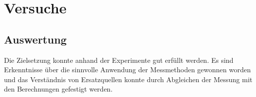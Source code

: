 \part{Versuche}











\chapter{Auswertung}

Die Zielsetzung konnte anhand der Experimente gut erfüllt werden.
Es sind Erkenntnisse über die sinnvolle Anwendung der Messmethoden gewonnen worden und das Verständnis von Ersatzquellen konnte durch Abgleichen der Messung mit den Berechnungen gefestigt werden.

